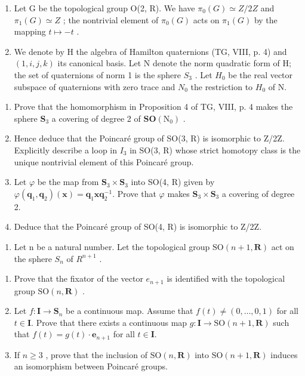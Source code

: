 \exercisegroup

\begin{enumerate}
\def\labelenumi{\arabic{enumi})}
\item
  Let G be the topological group O(2, R). We have \(\pi_{0}(G) \simeq Z/2Z\) and \(\pi_{1}(G) \simeq Z\) ; the nontrivial element of \(\pi_{0}(G)\) acts on \(\pi_{1}(G)\) by the mapping \(t \mapsto -t\) .
\item
  We denote by H the algebra of Hamilton quaternions (TG, VIII, p. 4) and \((1, i, j, k)\) its canonical basis. Let N denote the norm quadratic form of H; the set of quaternions of norm 1 is the sphere \(S_{3}\) . Let \(H_{0}\) be the real vector subspace of quaternions with zero trace and \(N_{0}\) the restriction to \(H_{0}\) of N.
\end{enumerate}

\begin{enumerate}
\def\labelenumi{\alph{enumi})}
\item
  Prove that the homomorphism in Proposition 4 of TG, VIII, p. 4 makes the sphere \(\mathbf{S}_3\) a covering of degree 2 of \(\mathbf{SO}(\mathrm{N}_0)\) .
\item
  Hence deduce that the Poincaré group of SO(3, R) is isomorphic to Z/2Z. Explicitly describe a loop in \(I_{3}\) in SO(3, R) whose strict homotopy class is the unique nontrivial element of this Poincaré group.
\item
  Let \(\varphi\) be the map from \(\mathbf{S}_3 \times \mathbf{S}_3\) into SO(4, R) given by \(\varphi(\mathbf{q}_1, \mathbf{q}_2)(\mathbf{x}) = \mathbf{q}_1 \mathbf{x} \mathbf{q}_2^{-1}\). Prove that \(\varphi\) makes \(\mathbf{S}_3 \times \mathbf{S}_3\) a covering of degree 2.
\item
  Deduce that the Poincaré group of SO(4, R) is isomorphic to Z/2Z.
\end{enumerate}

\begin{enumerate}
\def\labelenumi{\arabic{enumi})}
\setcounter{enumi}{2}
\tightlist
\item
  Let n be a natural number. Let the topological group \(\mathrm{SO}(n+1,\mathbf{R})\) act on the sphere \(S_{n}\) of \(R^{n+1}\) .
\end{enumerate}

\begin{enumerate}
\def\labelenumi{\alph{enumi})}
\item
  Prove that the fixator of the vector \(e_{n+1}\) is identified with the topological group \(\mathrm{SO}(n,\mathbf{R})\) .
\item
  Let \(f \colon \mathbf{I} \to \mathbf{S}_n\) be a continuous map. Assume that \(f(t) \neq (0, \ldots, 0, 1)\) for all \(t \in \mathbf{I} .\) Prove that there exists a continuous map \(g \colon \mathbf{I} \to \mathrm{SO}(n + 1, \mathbf{R})\) such that \(f(t) = g(t) \cdot \mathbf{e}_{n+1}\) for all \(t \in \mathbf{I} \).
\item
  If \(n \geqslant 3\) , prove that the inclusion of \(\mathrm{SO}(n, \mathbf{R})\) into \(\mathrm{SO}(n+1, \mathbf{R})\) induces an isomorphism between Poincaré groups.
\end{enumerate}

